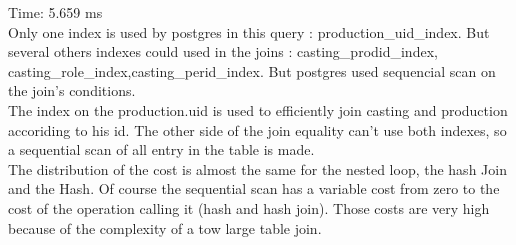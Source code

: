 \documentclass{article}
\begin{document}
Time: 5.659 ms\\

Only one index is used by postgres in this query : production_uid_index. But several others indexes could used in the joins : casting_prodid_index,  casting_role_index,casting_perid_index. But postgres used sequencial scan on the join's conditions.\\

The index on the production.uid is used to efficiently join casting and production accoriding to his id. The other side of the join equality can't use both indexes, so a sequential scan of all entry in the table is made.\\

The distribution of the cost is almost the same for the nested loop, the hash Join and the Hash. Of course the sequential scan has a variable cost from zero to the cost of the operation calling it (hash and hash join). Those costs are very high because of the complexity of a tow large table join.\\
\end{document}
